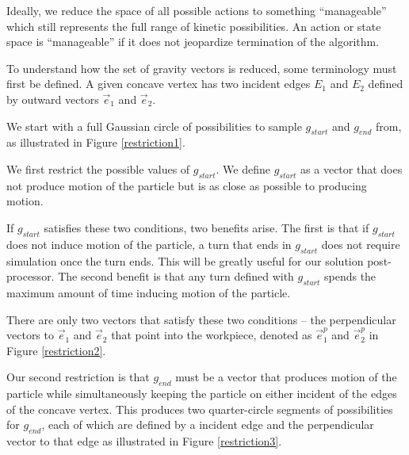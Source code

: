 Ideally, we reduce the space of all possible actions to something ``manageable'' which still represents the full range of kinetic possibilities. An action or state space is ``manageable'' if it does not jeopardize termination of the algorithm.

To understand how the set of gravity vectors is reduced, some terminology must first be defined. A given concave vertex has two incident edges $E_1$ and $E_2$ defined by outward vectors $\vec{e}_1$ and $\vec{e}_2$.


We start with a full Gaussian circle of possibilities to sample $g_{start}$ and $g_{end}$ from, as illustrated in Figure \ref{restriction1}.


We first restrict the possible values of $g_{start}$. We define $g_{start}$ as a vector that does not produce motion of the particle but is as close as possible to producing motion.

If $g_{start}$ satisfies these two conditions, two benefits arise. The first is that if $g_{start}$ does not induce motion of the particle, a turn that ends in $g_{start}$ does not require simulation once the turn ends. This will be greatly useful for our solution post-processor. The second benefit is that any turn defined with $g_{start}$ spends the maximum amount of time inducing motion of the particle.

There are only two vectors that satisfy these two conditions -- the perpendicular vectors to $\vec{e}_1$ and $\vec{e}_2$ that point into the workpiece, denoted as $\vec{e}_1^p$ and $\vec{e}_2^p$ in Figure \ref{restriction2}.


Our second restriction is that $g_{end}$ must be a vector that produces motion of the particle while simultaneously keeping the particle on either incident of the edges of the concave vertex. This produces two quarter-circle segments of possibilities for $g_{end}$, each of which are defined by a incident edge and the perpendicular vector to that edge as illustrated in Figure \ref{restriction3}.


